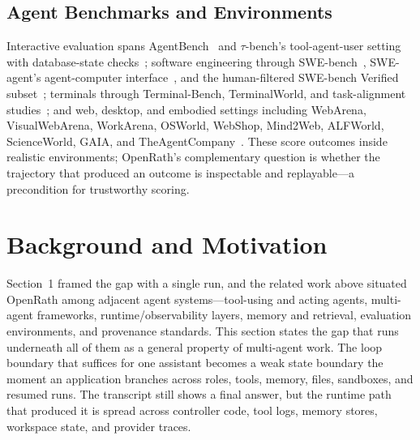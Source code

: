 \documentclass{llmxive}
\begin{document}
\subsection{Agent Benchmarks and Environments}

Interactive evaluation spans AgentBench~\cite{agentbench} and $\tau$-bench's
tool-agent-user setting with database-state checks~\cite{taubench}; software
engineering through SWE-bench~\cite{swebench}, SWE-agent's agent-computer
interface~\cite{swe-agent}, and the human-filtered SWE-bench Verified
subset~\cite{swebench-verified}; terminals through Terminal-Bench, TerminalWorld,
and task-alignment studies~\cite{terminal-bench,terminalworld,tab-benchmark}; and
web, desktop, and embodied settings including WebArena, VisualWebArena,
WorkArena, OSWorld, WebShop, Mind2Web, ALFWorld, ScienceWorld, GAIA, and
TheAgentCompany~\cite{webarena,visualwebarena,workarena,osworld,webshop,mind2web,alfworld,scienceworld,gaia,theagentcompany}.
These score outcomes inside realistic environments; OpenRath's complementary
question is whether the trajectory that produced an outcome is inspectable and
replayable---a precondition for trustworthy scoring.



\section{Background and Motivation}

Section~1 framed the gap with a single run, and the related work above situated
OpenRath among adjacent agent systems---tool-using and acting agents, multi-agent
frameworks, runtime/observability layers, memory and retrieval, evaluation
environments, and provenance standards. This section states the gap that runs
underneath all of them as a general property of multi-agent work. The loop
boundary that suffices for one assistant becomes a weak state boundary the moment
an application branches across roles, tools, memory, files, sandboxes, and
resumed runs. The transcript still shows a final answer, but the runtime path
that produced it is spread across controller code, tool logs, memory stores,
workspace state, and provider traces.
\end{document}
